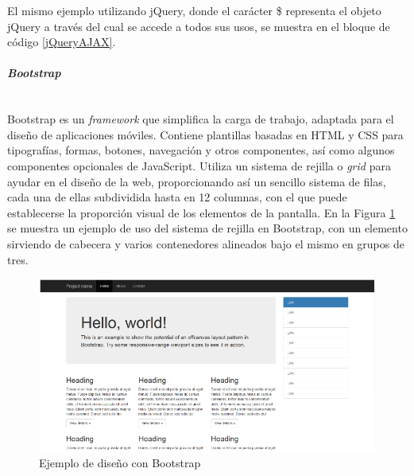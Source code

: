 El mismo ejemplo utilizando jQuery, donde el carácter \$ representa el objeto jQuery a través del cual se accede a todos sus usos, se muestra en el bloque de código \ref{jQueryAJAX}.


\paragraph{\emph{Bootstrap}} ~\\

Bootstrap es un \emph{framework} que simplifica la carga de trabajo, adaptada para el diseño de aplicaciones móviles. Contiene plantillas basadas en HTML y CSS para tipografías, formas, botones, navegación y otros componentes, así como algunos componentes opcionales de JavaScript. Utiliza un sistema de rejilla o \emph{grid} para ayudar en el diseño de la web, proporcionando así un sencillo sistema de filas, cada una de ellas subdividida hasta en 12 columnas, con el que puede establecerse la proporción visual de los elementos de la pantalla. En la Figura \ref{gridBootstrap} se muestra un ejemplo de uso del sistema de rejilla en Bootstrap, con un elemento sirviendo de cabecera y varios contenedores alineados bajo el mismo en grupos de tres.

\begin{figure}[!t]
\begin{center}
\includegraphics[width=0.75\linewidth]{./3_Tecnologias/Img/gridBootstrap.png}
\end{center}
\caption{Ejemplo de diseño con Bootstrap}
\label{gridBootstrap}
\end{figure}